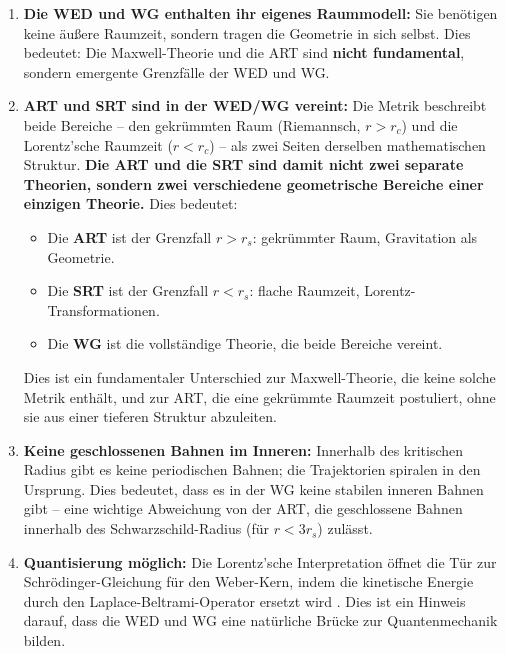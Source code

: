 \begin{enumerate}
    \item \textbf{Die WED und WG enthalten ihr eigenes Raummodell:} Sie benötigen keine äußere Raumzeit, sondern tragen die Geometrie in sich selbst. Dies bedeutet: Die Maxwell-Theorie und die ART sind \textbf{nicht fundamental}, sondern emergente Grenzfälle der WED und WG.
    
    \item \textbf{ART und SRT sind in der WED/WG vereint:} Die Metrik beschreibt beide Bereiche – den gekrümmten Raum (Riemannsch, \( r > r_c \)) und die Lorentz'sche Raumzeit (\( r < r_c \)) – als zwei Seiten derselben mathematischen Struktur. \textbf{Die ART und die SRT sind damit nicht zwei separate Theorien, sondern zwei verschiedene geometrische Bereiche einer einzigen Theorie.} Dies bedeutet:
    
    \begin{itemize}
        \item Die \textbf{ART} ist der Grenzfall \( r > r_s \): gekrümmter Raum, Gravitation als Geometrie.
        \item Die \textbf{SRT} ist der Grenzfall \( r < r_s \): flache Raumzeit, Lorentz-Transformationen.
        \item Die \textbf{WG} ist die vollständige Theorie, die beide Bereiche vereint.
    \end{itemize}
    
    Dies ist ein fundamentaler Unterschied zur Maxwell-Theorie, die keine solche Metrik enthält, und zur ART, die eine gekrümmte Raumzeit postuliert, ohne sie aus einer tieferen Struktur abzuleiten.
    
    \item \textbf{Keine geschlossenen Bahnen im Inneren:} Innerhalb des kritischen Radius gibt es keine periodischen Bahnen; die Trajektorien spiralen in den Ursprung. Dies bedeutet, dass es in der WG keine stabilen inneren Bahnen gibt – eine wichtige Abweichung von der ART, die geschlossene Bahnen innerhalb des Schwarzschild-Radius (für \( r < 3r_s \)) zulässt.
    
    \item \textbf{Quantisierung möglich:} Die Lorentz'sche Interpretation öffnet die Tür zur Schrödinger-Gleichung für den Weber-Kern, indem die kinetische Energie durch den Laplace-Beltrami-Operator ersetzt wird \cite{FrauenfelderWeber2024}. Dies ist ein Hinweis darauf, dass die WED und WG eine natürliche Brücke zur Quantenmechanik bilden.
\end{enumerate}

